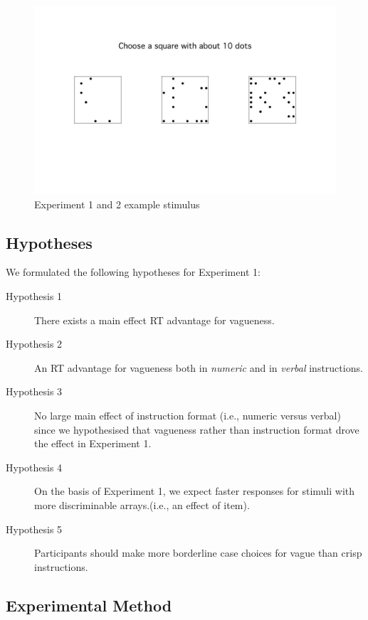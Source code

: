 \begin{figure}[htbp]
\centering
\includegraphics[width=.75\textwidth]{figures/Ce1-example-screenshot}
\caption{Experiment 1 and 2 example stimulus}
\label{Experiment1and2examplestimulus}
\end{figure}

\subsection{Hypotheses} 

We formulated the following hypotheses for Experiment 1:

\begin{description}
	\item [Hypothesis 1] There exists a main effect RT advantage for vagueness.
	\item [Hypothesis 2] An RT advantage for vagueness both in \emph{numeric} and in \emph{verbal} instructions.
	\item [Hypothesis 3] No large main effect of instruction format (i.e., numeric versus verbal) since we hypothesised that vagueness rather than instruction format drove the effect in Experiment 1.
	\item [Hypothesis 4] On the basis of Experiment 1, we expect faster responses for stimuli with more discriminable arrays.(i.e., an effect of item).
	\item [Hypothesis 5] Participants should make more borderline case choices for vague than crisp instructions.
\end{description}

\subsection{Experimental Method} 

